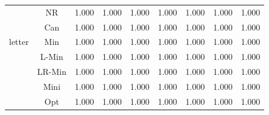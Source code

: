 \documentclass[11pt]{book}
\begin{document}
\begin{table}
\begin{tabular}{|c|c|c|c|c|c|c|c|c|}
    \hline
    \multirow{5}{*}{letter}
         & NR & 1.000 & 1.000 & 1.000 & 1.000 & 1.000 & 1.000 & 1.000 \\                                                                                                                                             
         & Can & 1.000 & 1.000 & 1.000 & 1.000 & 1.000 & 1.000 & 1.000 \\                                                                                                                                            
         & Min & 1.000 & 1.000 & 1.000 & 1.000 & 1.000 & 1.000 & 1.000 \\                                                                                                                                            
         & L-Min & 1.000 & 1.000 & 1.000 & 1.000 & 1.000 & 1.000 & 1.000 \\                                                                                                                                          
         & LR-Min & 1.000 & 1.000 & 1.000 & 1.000 & 1.000 & 1.000 & 1.000 \\                                                                                                                                         
         & Mini & 1.000 & 1.000 & 1.000 & 1.000 & 1.000 & 1.000 & 1.000 \\                                                                                                                                           
         & Opt & 1.000 & 1.000 & 1.000 & 1.000 & 1.000 & 1.000 & 1.000 \\
	

\end{tabular}
\end{table}
\end{document}
